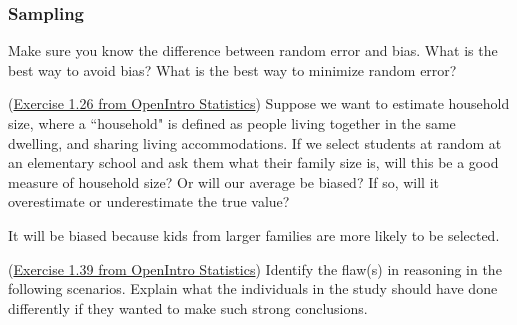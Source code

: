 \documentclass[12pt]{exam}
\newcounter{countA}
\begin{document}
\subsubsection*{Sampling}\label{sampling}

Make sure you know the difference between random error and bias. What is the best way to avoid bias?  What is the best way to minimize random error? 

\begin{questions}
\setcounter{question}{\value{countA}}
\question (\href{http://people.hsc.edu/faculty-staff/blins/books/OpenIntroStats4e.pdf\#eoce.1.26}{Exercise 1.26 from OpenIntro Statistics}) Suppose we want to estimate household size, where a ``household" is defined as people
living together in the same dwelling, and sharing living accommodations. If we select students at random
at an elementary school and ask them what their family size is, will this be a good measure of household
size? Or will our average be biased? If so, will it overestimate or underestimate the true value?
\begin{solution}
It will be biased because kids from larger families are more likely to be selected.  
\end{solution}
\bigskip

\question (\href{http://people.hsc.edu/faculty-staff/blins/books/OpenIntroStats4e.pdf\#eoce.1.39}{Exercise 1.39 from OpenIntro Statistics}) Identify the flaw(s) in reasoning in the following scenarios. Explain what the
individuals in the study should have done differently if they wanted to make such strong conclusions.
\end{questions}
\end{document}

